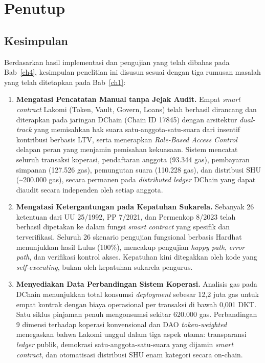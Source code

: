 \chapter{Penutup}
\label{ch5}

\section{Kesimpulan}

Berdasarkan hasil implementasi dan pengujian yang telah dibahas pada Bab~\ref{ch4}, kesimpulan penelitian ini disusun sesuai dengan tiga rumusan masalah yang telah ditetapkan pada Bab~\ref{ch1}:

\begin{enumerate}
	\item \textbf{Mengatasi Pencatatan Manual tanpa Jejak Audit.} Empat \textit{smart contract} Lakomi (Token, Vault, Govern, Loans) telah berhasil dirancang dan diterapkan pada jaringan DChain (Chain ID 17845) dengan arsitektur \textit{dual-track} yang memisahkan hak suara satu-anggota-satu-suara dari insentif kontribusi berbasis LTV, serta menerapkan \textit{Role-Based Access Control} delapan peran yang menjamin pemisahan kekuasaan. Sistem mencatat seluruh transaksi koperasi, pendaftaran anggota (93.344 gas), pembayaran simpanan (127.526 gas), pemungutan suara (110.228 gas), dan distribusi SHU (\textasciitilde200.000 gas), secara permanen pada \textit{distributed ledger} DChain yang dapat diaudit secara independen oleh setiap anggota.

	\item \textbf{Mengatasi Ketergantungan pada Kepatuhan Sukarela.} Sebanyak 26 ketentuan dari UU 25/1992, PP 7/2021, dan Permenkop 8/2023 telah berhasil dipetakan ke dalam fungsi \textit{smart contract} yang spesifik dan terverifikasi. Seluruh 26 skenario pengujian fungsional berbasis Hardhat menunjukkan hasil Lulus (100\%), mencakup pengujian \textit{happy path}, \textit{error path}, dan verifikasi kontrol akses. Kepatuhan kini ditegakkan oleh kode yang \textit{self-executing}, bukan oleh kepatuhan sukarela pengurus.

	\item \textbf{Menyediakan Data Perbandingan Sistem Koperasi.} Analisis gas pada DChain menunjukkan total konsumsi \textit{deployment} sebesar 12,2 juta gas untuk empat kontrak dengan biaya operasional per transaksi di bawah 0,001 DKT. Satu siklus pinjaman penuh mengonsumsi sekitar 620.000 gas. Perbandingan 9 dimensi terhadap koperasi konvensional dan DAO \textit{token-weighted} menegaskan bahwa Lakomi unggul dalam tiga aspek utama: transparansi \textit{ledger} publik, demokrasi satu-anggota-satu-suara yang dijamin \textit{smart contract}, dan otomatisasi distribusi SHU enam kategori secara on-chain.
\end{enumerate}

